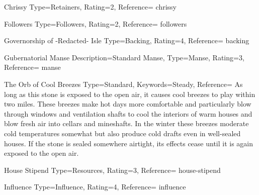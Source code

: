 ﻿


\begin{Merit}{Chrissy}{%
    Type=Retainers,
    Rating=2,
    Reference=\cite*[p.~164]{ex3}
}{chrissy}
    \TBW
\end{Merit}


\begin{Merit}{Followers}{%
    Type=Followers,
    Rating=2,
    Reference=\cite*[p.~161]{ex3}
}{followers}
    \TBW
\end{Merit}


\begin{Merit}{Governorship of -Redacted- Isle}{%
    Type=Backing,
    Rating=4,
    Reference=\cite*[p.~159]{ex3}
}{backing}
    \TBW
\end{Merit}


\begin{Merit}{Gubernatorial Manse}{%
    Description={Standard Manse},
    Type=Manse,
    Rating=3,
    Reference=\cite*[p.~163]{ex3}
}{manse}
    \TBW

    \begin{Hearthstone}{The Orb of Cool Breezes}{%
        Type=Standard,
        Keywords=Steady,
        Reference=\cite*[p.~604]{ex3}
    }
        As long as this stone is exposed to the open air, it causes cool
        breezes to play within two miles. These breezes make hot days more
        comfortable and particularly blow through windows and ventilation
        shafts to cool the interiors of warm houses and blow fresh air into
        cellars and mineshafts. In the winter these breezes moderate cold
        temperatures somewhat but also produce cold drafts even in
        well-sealed houses. If the stone is sealed somewhere airtight, its
        effects cease until it is again exposed to the open air.
    \end{Hearthstone}
\end{Merit}


\DocumentColumnBreak
\begin{Merit}{House Stipend}{%
    Type=Resources,
    Rating=3,
    Reference=\cite*[p.~164]{ex3}
}{house-stipend}
    \TBW

\end{Merit}


\begin{Merit}{Influence}{%
    Type=Influence,
    Rating=4,
    Reference=\cite*[p.~162]{ex3}
}{influence}
    \TBW
\end{Merit}


